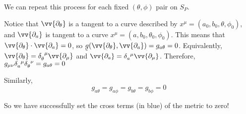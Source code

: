 \documentclass[11pt,table]{article}
\newcommand{\ut}[1]{\underaccent{\tilde}{#1}}
\renewcommand{\vec}[1]{\ut{#1}}
\begin{document}
We can repeat this process for each fixed $(\theta, \phi)$ pair on $S_P$.

Notice that $\vv{\partial_\theta}$ is a tangent to a curve described by $x^\mu = (a_0, b_0, \theta, \phi_0)$, and $\vv{\partial_a}$ is tangent to a curve $x^\mu = (a, b_0, \theta_0, \phi_0)$.
This means that $\vv{\partial_\theta} \cdot \vv{\partial_a} = 0$, so $\vec{g}(\vv{\partial_\theta}, \vv{\partial_a}) = g_{a\theta} = 0$.
Equivalently, $\vv{\partial_\theta} = \tensor{\delta}{_\theta^\mu} \vv{\partial_\mu}$ and $\vv{\partial_a} = \tensor{\delta}{_a^\mu} \vv{\partial_\mu}$.
Therefore, $g_{\mu\nu} \tensor{\delta}{_a^\mu} \tensor{\delta}{_\theta^\nu} = g_{a\theta} = 0$

Similarly,
\[ g_{a\theta} = g_{a\phi} = g_{b\theta} = g_{b\phi} = 0 \]

So we have successfully set the cross terms (in blue) of the metric to zero!
\end{document}
